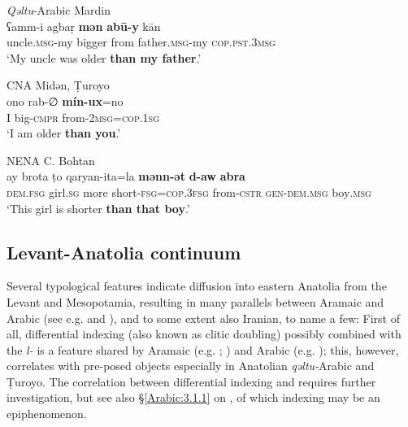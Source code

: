 \documentclass[output=paper,colorlinks,citecolor=brown,draftmode]{langscibook}
\begin{document}
\ea\label{Arabic:ex:59}
\textit{Qəltu}-Arabic Mardin \citep[I2:§32]{Jastrow1981MAqetlu2} \\
\gll ʕamm-i agbaṛ \textbf{mən} \textbf{abū-y} kān \\
uncle\textsc{.msg-}my bigger from father\textsc{.msg-}my \textsc{cop.pst.3msg} \\
\glt `My uncle was older \textbf{than my father}.'
\z

\ea\label{Arabic:ex:60}
CNA Midən, Ṭuroyo \citep[83:§39]{Ritter1967Turoyo} \\
\gll ono rab-∅ \textbf{mín-ux}=no \\
I big\textsc{-cmpr} from\textsc{-2msg=cop.1sg} \\
\glt `I am older \textbf{than you}.'
\z

\ea\label{Arabic:ex:61}
NENA C. Bohtan \citep[95]{Fox2009NABohtan} \\
\gll ay brota ṭo qaryan-ita=la \textbf{mənn-ət} \textbf{d-aw} \textbf{abra} \\ 
\textsc{dem.fsg} girl\textsc{.sg} more short\textsc{-fsg=cop.3fsg} from\textsc{-cstr} \textsc{gen-dem.msg} boy\textsc{.msg} \\
\glt `This girl is shorter \textbf{than that boy}.'
\z

\subsection{Levant-Anatolia continuum}\label{Arabic:3.2}

Several typological features indicate diffusion into eastern Anatolia from the Levant and Mesopotamia, resulting in many parallels between Aramaic and Arabic (see e.g. \citealt{Weninger2012AAContact} and \citealt{Prochazka2020AIST}), and to some extent also Iranian, to name a few: First of all, differential  indexing (also known as clitic doubling) possibly combined with the  \textit{l-} is a feature shared by Aramaic (e.g. \citealt{Coghill2014}; \citealt[290–294, 307–308, 350–370]{Noorlander2021Alignment}) and Arabic (e.g. \citealt{Souag2017CDoubling}); this, however, correlates with pre-posed objects especially in Anatolian \textit{qəltu-}Arabic and Ṭuroyo. The correlation between differential  indexing and  requires further investigation, but see also §\ref{Arabic:3.1.1} on , of which indexing may be an epiphenomenon.
\end{document}
